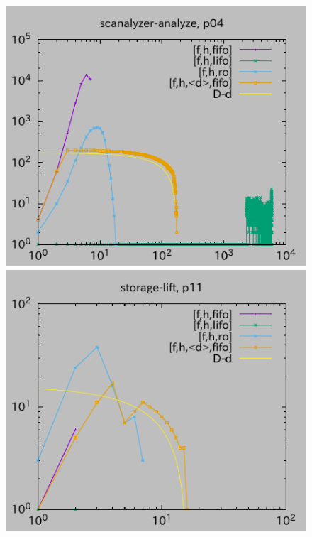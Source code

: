 \begin{figure}[tb]
\includegraphics{img/depth/scanalyzer-analyze/p04.pdf}
\includegraphics{img/depth/storage-lift/p11.pdf}

\end{figure}
